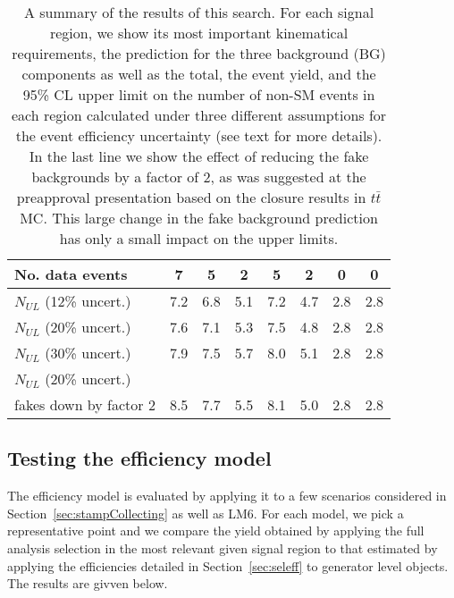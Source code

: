 \begin{table}
\begin{tabular}{|l|c|c|c|c|c|c|c|}
No. data events & 7 & 5 & 2 & 5 & 2 & 0 & 0 \\
\hline
$N_{UL}$ (12\% uncert.) & 7.2 & 6.8 & 5.1 & 7.2 & 4.7 & 2.8 & 2.8 \\
$N_{UL}$ (20\% uncert.) & 7.6 & 7.1 & 5.3 & 7.5 & 4.8 & 2.8 & 2.8 \\
$N_{UL}$ (30\% uncert.) & 7.9 & 7.5 & 5.7 & 8.0 & 5.1 & 2.8 & 2.8 \\ \hline \hline
$N_{UL}$ (20\% uncert.) &     &     &     &     &     &     &     \\
fakes down by factor 2  & 8.5 & 7.7 & 5.5 & 8.1 & 5.0 & 2.8 & 2.8 \\
\hline
\end{tabular}
\caption{\label{tab:outreach} A summary of the results of this search.  For each signal region,
we show its most important kinematical requirements, the prediction for the three background 
(BG) components as well as the total, the event yield, and the 95\% CL upper 
limit on the number of non-SM events in each region calculated under three different 
assumptions for the event efficiency uncertainty (see text for more details).
In the last line we show the effect of reducing the fake backgrounds
by a factor of 2, as was suggested at the preapproval presentation based
on the closure results in $t\bar{t}$ MC.  This large change in the fake background
prediction has only a small impact on the upper limits.}
\end{table}


\subsection{Testing the efficiency model}
\label{sec:outreachtest}


The efficiency model is evaluated by applying it to a few 
scenarios considered in Section~\ref{sec:stampCollecting} as
well as LM6.   
For each model, we pick a representative point
and we compare the
yield obtained by applying the full analysis selection 
in the most relevant given signal region 
to that estimated by applying the efficiencies detailed in 
Section~\ref{sec:seleff} to generator level objects.  
The results are givven below.

